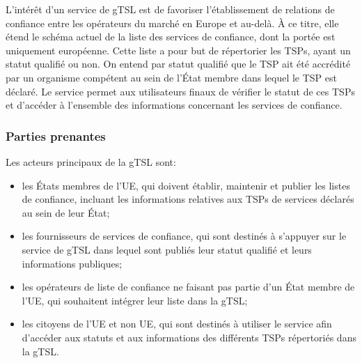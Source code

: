 \documentclass{tnreport}
\begin{document}
L'intérêt d'un service de 
gTSL 
est de favoriser l'établissement de relations de confiance entre les opérateurs du marché en Europe et au-delà. À ce titre, elle étend le schéma actuel de la liste des services de confiance, dont la portée est uniquement européenne. Cette liste a pour but de répertorier les TSPs, ayant un statut qualifié ou non. On entend par statut qualifié que le TSP ait été accrédité par un organisme compétent au sein de l’État membre dans lequel le TSP est déclaré. Le service permet aux utilisateurs finaux de vérifier le statut de ces TSPs et d'accéder à l'ensemble des informations concernant les services de confiance.


\subsubsection{Parties prenantes}

Les acteurs principaux de la 
gTSL
sont:
\begin{itemize}
	\item les États membres de l'UE, qui doivent établir, maintenir et publier les listes de confiance, incluant les informations relatives aux TSPs de services déclarés au sein de leur État;
	\item les fournisseurs de services de confiance, qui sont destinés à s'appuyer sur le service de gTSL dans lequel sont publiés leur statut qualifié et leurs informations publiques;
	\item les opérateurs de liste de confiance ne faisant pas partie d'un État membre de l'UE, qui souhaitent intégrer leur liste dans la gTSL;
	\item les citoyens de l'UE et non UE, qui sont destinés à utiliser le service afin d'accéder aux statuts et aux informations des différents TSPs répertoriés dans la gTSL.
\end{itemize}
\end{document}
